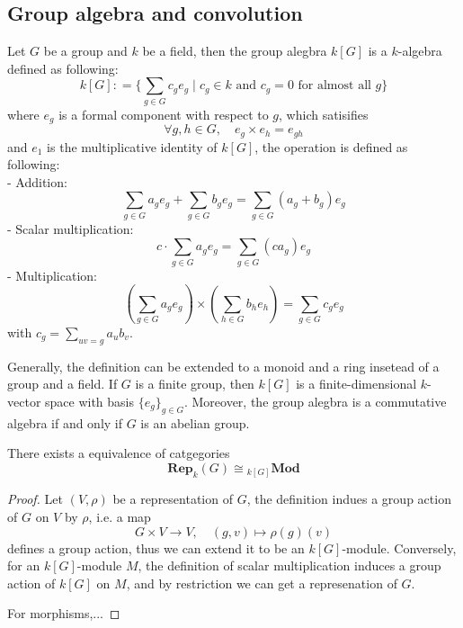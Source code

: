 \subsection{Group algebra and convolution}

\begin{definition}
    Let \(G\) be a group and \(k\) be a field, then the group alegbra \(k[G]\) is a \(k\)-algebra defined as following:
    \[k[G] : = \{\sum_{g \in G}c_ge_g \mid c_g \in k \text{ and } c_g = 0 \text{ for almost all } g\}\]
    where \(e_g\) is a formal component with respect to \(g\), which satisifies
    \[\forall g,h \in G, \quad e_g \times e_h = e_{gh}\]
    and \(e_1\) is the multiplicative identity of \(k[G]\),
    the operation is defined as following:\\
    - Addition:
    \[\sum_{g \in G}a_ge_g + \sum_{g \in G}b_ge_g = \sum_{g \in G} (a_g + b_g)e_g\]
    - Scalar multiplication:
    \[c \cdot \sum_{g \in G} a_ge_g = \sum_{g \in G} (ca_g)e_g\]
    - Multiplication:
    \[(\sum_{g \in G} a_ge_g) \times (\sum_{h \in G} b_he_h) = \sum_{g \in G}c_ge_g\]
    with \(c_g = \sum_{uv = g}a_ub_v\).
\end{definition}

\begin{remark}
    Generally, the definition can be extended to a monoid and a ring insetead of a group and a field. If \(G\) is a finite group, then \(k[G]\) is a finite-dimensional \(k\)-vector space with basis \(\{e_g\}_{g \in G}\). Moreover, the group alegbra is a commutative algebra if and only if \(G\) is an abelian group.
\end{remark}

\begin{colorproposition}
    There exists a equivalence of catgegories
    \[\mathbf{Rep}_k(G) \cong {}_{k[G]}\mathbf{Mod}\]
\end{colorproposition}

\begin{proof}
    Let \((V,\rho)\) be a representation of \(G\), the definition indues a group action of \(G\) on \(V\) by \(\rho\), i.e. a map 
    \[G\times V \to V, \quad (g,v) \mapsto \rho(g)(v) \]
    defines a group action, thus we can extend it to be an \(k[G]\)-module. Conversely, for an \(k[G]\)-module \(M\), the definition of scalar multiplication induces a group action of \(k[G]\) on \(M\), and by restriction we can get a represenation of \(G\).

    For morphisms,...
\end{proof}

